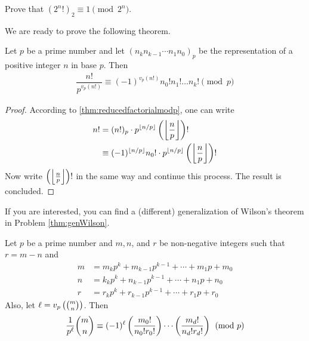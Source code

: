 	\begin{problem}
		Prove that $(2^n!)_2 \equiv 1 \pmod{2^n}$.
	\end{problem}

We are ready to prove the following theorem.

	\begin{theorem}\label{thm:wilsongeneral}
		Let $p$ be a prime number and let $(n_k n_{k-1}\cdots n_1 n_0)_p$ be the representation of a positive integer $n$ in base $p$. Then
			\begin{align}\label{eq:wilsongeneral}
				\dfrac{n!}{p^{v_p(n!)}}\equiv (-1)^{v_p(n!)} n_0!n_1!\dots n_k!\pmod p
			\end{align}
	\end{theorem}

	\begin{proof}
		According to \autoref{thm:reducedfactorialmodp}, one can write
			\begin{align*}
				n!
					& = (n!)_p \cdot p^{\left\lfloor{n/p}\right\rfloor}\left(\left\lfloor{\frac{n}{p}}\right\rfloor\right)!\\
					& \equiv (-1)^{\lfloor n/p\rfloor} n_0! \cdot p^{\left\lfloor{n/p}\right\rfloor}\left(\left\lfloor{\frac{n}{p}}\right\rfloor\right)!
			\end{align*}
		Now write $\left(\left\lfloor{\frac np}\right\rfloor\right)!$ in the same way and continue this process. The result is concluded.
	\end{proof}

	\begin{note}
		If you are interested, you can find a (different) generalization of Wilson's theorem in Problem \ref{thm:genWilson}.
	\end{note}
	\begin{theorem}
		Let $p$ be a prime number and $m, n$, and $r$ be non-negative integers such that $r=m-n$ and
			\begin{align*}
				m&=m_kp^k+m_{k-1}p^{k-1}+\cdots +m_1p+m_0\\
				n&=k_kp^k+n_{k-1}p^{k-1}+\cdots +n_1p+n_0\\
				r&=r_kp^k+r_{k-1}p^{k-1}+\cdots +r_1p+r_0
			\end{align*}
		Also, let $\ell = v_{p}\left(\binom{m}{n}\right)$. Then
			\begin{align*}
				\frac1{p^\ell}\binom{m}{n}\equiv (-1)^\ell
				\left(\frac{m_0!}{n_0!r_0!}\right)\cdots \left(\frac{m_d!}{n_d!r_d!}\right)\pmod p
			\end{align*}
	\end{theorem}

